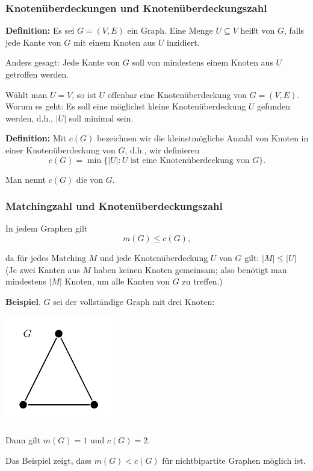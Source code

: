 \documentclass[smaller]{beamer}
\begin{document}
\begin{frame}
 \frametitle{Knotenüberdeckungen und Knotenüberdeckungszahl}
 \textbf{Definition:} Es sei $G=(V,E)$ ein Graph. Eine Menge $U \subseteq V$ heißt  von $G$, falls jede Kante von $G$ mit einem Knoten aus $U$ inzidiert. \\ \vspace*{0.2cm}

Anders gesagt: Jede Kante von $G$ soll von mindestens einem Knoten aus $U$ getroffen werden. \\ \vspace*{0.2cm}

Wählt man $U=V$, so ist $U$ offenbar eine Knotenüberdeckung von $G=(V,E)$. Worum es geht: Es soll eine möglichst kleine Knotenüberdeckung $U$ gefunden werden, d.h., \alert{$|U|$ soll minimal sein}. \\ \vspace*{0.2cm}

\textbf{Definition:} Mit $c(G)$ bezeichnen wir die kleinstmögliche Anzahl von Knoten in einer Knotenüberdeckung von $G$, d.h., wir definieren
\[
c(G) = \min{\big\{ |U| : U \text{ ist eine Knotenüberdeckung von $G$} \big\}}.
\]

Man nennt $c(G)$ die  von $G$.
\end{frame}

\begin{frame}
 \frametitle{Matchingzahl und Knotenüberdeckungszahl}
 In jedem Graphen gilt
\begin{equation}
\label{eq:11:1}
m(G) \leq c(G),
\end{equation}

da für jedes Matching $M$ und jede Knotenüberdeckung $U$ von $G$ gilt: $|M| \leq |U|$ (Je zwei Kanten aus $M$ haben keinen Knoten gemeinsam; also benötigt man mindestens $|M|$ Knoten, um alle Kanten von $G$ zu treffen.) \\ \vspace*{0.2cm}

\textbf{Beispiel}. $G$ sei der vollständige Graph mit drei Knoten:

\begin{center}
 \includegraphics[scale = 0.8]{fig45.pdf}
\end{center}

Dann gilt $m(G)=1$ und $c(G)=2$. \\ \vspace*{0.2cm}

Das Beispiel zeigt, dass $m(G) < c(G)$ für nichtbipartite Graphen möglich ist. 
\end{frame}
\end{document}
